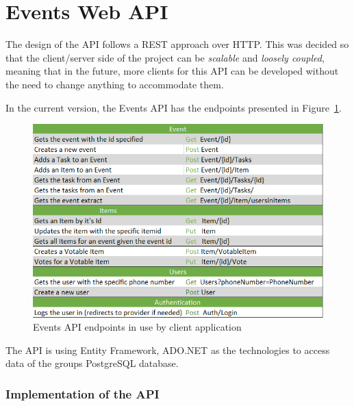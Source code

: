 \section{Events Web API}

The design of the API follows a REST approach over HTTP. This was decided so that the client/server side of the project can be \textit{scalable} and \textit{loosely coupled}, meaning that in the future, more clients for this API can be developed without the need to change anything to accommodate them.


In the current version, the Events API has the endpoints presented in Figure~\ref{fig:Endpoints}.


\begin{figure}[!ht]
	\centering
	\includegraphics[width=1\textwidth,height=.45\textheight]{./Chapter3/Figures/EventsAPI_Endpoints}
	\caption{Events API endpoints in use by client application}
	\label{fig:Endpoints}
\end{figure}


The API is using Entity Framework, ADO.NET as the technologies to access data of the groups PostgreSQL database.

\newpage



\subsubsection{Implementation of the API}

